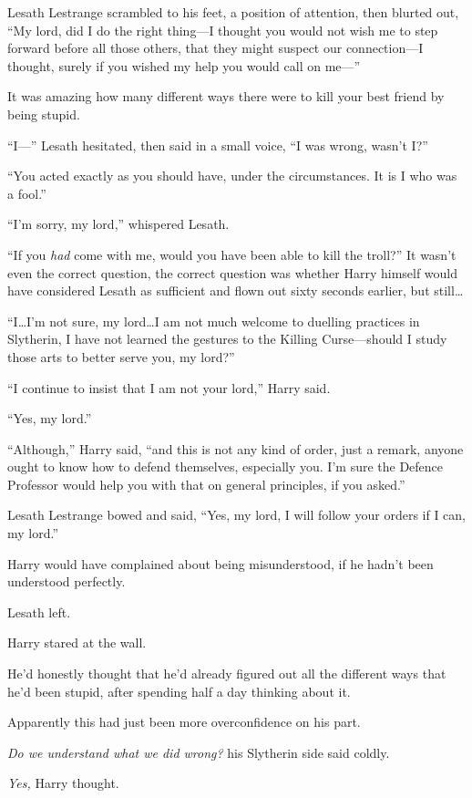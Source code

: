 Lesath Lestrange scrambled to his feet, a position of attention, then blurted
out, “My lord, did I do the right thing—I thought you would not wish me to
step forward before all those others, that they might suspect our
connection—I thought, surely if you wished my help you would call on me—”

It was amazing how many different ways there were to kill your best friend by
being stupid.

“I—” Lesath hesitated, then said in a small voice, “I was wrong, wasn’t I?”

“You acted exactly as you should have, under the circumstances. It is I who was
a fool.”

“I’m sorry, my lord,” whispered Lesath.

“If you \emph{had} come with me, would you have been able to kill the troll?”
It wasn’t even the correct question, the correct question was whether Harry
himself would have considered Lesath as sufficient and flown out sixty seconds
earlier, but still…

“I…I’m not sure, my lord…I am not much welcome to duelling
practices in Slytherin, I have not learned the gestures to the Killing
Curse—should I study those arts to better serve you, my lord?”

“I continue to insist that I am not your lord,” Harry said.

“Yes, my lord.”

“Although,” Harry said, “and this is not any kind of order, just a remark,
anyone ought to know how to defend themselves, especially you. I’m sure the
Defence Professor would help you with that on general principles, if you asked.”

Lesath Lestrange bowed and said, “Yes, my lord, I will follow your orders if I
can, my lord.”

Harry would have complained about being misunderstood, if he hadn’t been
understood perfectly.

Lesath left.

Harry stared at the wall.

He’d honestly thought that he’d already figured out all the different ways that
he’d been stupid, after spending half a day thinking about it.

Apparently this had just been more overconfidence on his part.

\emph{Do we understand what we did wrong?} his Slytherin side said coldly.

\emph{Yes,} Harry thought.

